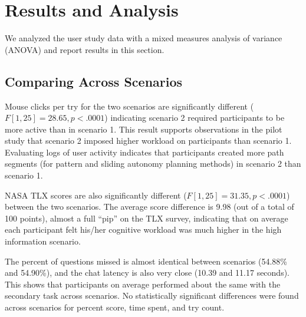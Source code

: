 \section{Results and Analysis} 
\label{sec:Results}

We analyzed the user study data with a mixed measures analysis of variance (ANOVA) and report results in this section.

\subsection{Comparing Across Scenarios}


Mouse clicks per try for the two scenarios are significantly different ($F[1,25]= 28.65, p<.0001$) indicating scenario 2 required participants to be more active than in scenario 1. This result supports observations in the pilot study that scenario 2 imposed higher workload on participants than scenario 1. Evaluating logs of user activity indicates that participants created more path segments (for pattern and sliding autonomy planning methods) in scenario 2 than scenario 1. 

NASA TLX scores are also significantly different ($F[1,25]= 31.35, p<.0001$) between the two scenarios. The average score difference is 9.98 (out of a total of 100 points), almost a full ``pip'' on the TLX survey, indicating that on average each participant felt his/her cognitive workload was much higher in the high information scenario.

The percent of questions missed is almost identical between scenarios (54.88\% and 54.90\%), and the chat latency is also very close (10.39 and 11.17 seconds). This shows that participants on average performed about the same with the secondary task across scenarios. No statistically significant differences were found across scenarios for percent score, time spent, and try count.

